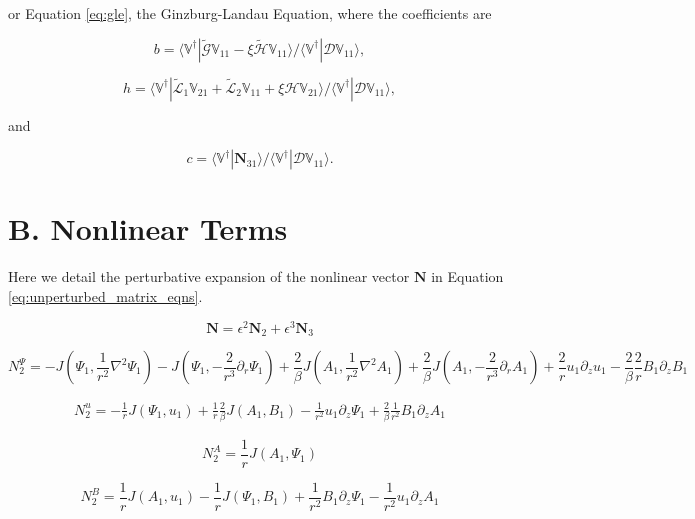 \documentclass{emulateapj}
\newcommand{\beq}{\begin{equation}}
\newcommand{\eeq}{\end{equation}}
\begin{document}
or Equation \ref{eq:gle}, the Ginzburg-Landau Equation, where the coefficients are 

\beq
b = \langle  \mathbb{V}^\dagger | \widetilde{\mathcal{G}} \mathbb{V}_{11} - \xi \widetilde{\mathcal{H}} \mathbb{V}_{11} \rangle / \langle \mathbb{V}^\dagger | \mathcal{D} \mathbb{V}_{11} \rangle,
\eeq

\beq
h = \langle \mathbb{V}^\dagger | \widetilde{\mathcal{L}}_1 \mathbb{V}_{21} + \widetilde{\mathcal{L}}_2 \mathbb{V}_{11} + \xi \mathcal{H} \mathbb{V}_{21} \rangle / \langle \mathbb{V}^\dagger | \mathcal{D} \mathbb{V}_{11} \rangle,
\eeq

and

\beq
c = \langle \mathbb{V}^\dagger | \mathbf{N}_{31} \rangle / \langle \mathbb{V}^\dagger | \mathcal{D} \mathbb{V}_{11} \rangle. 
\eeq

\section{B. Nonlinear Terms}\label{app:nonlinear_terms}

Here we detail the perturbative expansion of the nonlinear vector $\mathbf{N}$ in Equation \ref{eq:unperturbed_matrix_eqns}. 

\beq
\mathbf{N} = \epsilon^2 \mathbf{N}_2 + \epsilon^3 \mathbf{N}_3
\eeq

\beq
N_2^{\Psi}  = -J(\Psi_1, \frac{1}{r^2} \nabla^2 \Psi_1) - J(\Psi_1, -\frac{2}{r^3}\partial_r\Psi_1)
+ \frac{2}{\beta} J (A_1, \frac{1}{r^2} \nabla^2 A_1) + \frac{2}{\beta} J(A_1, -\frac{2}{r^3} \partial_r A_1) + \frac{2}{r} u_1 \partial_z u_1 - \frac{2}{\beta} \frac{2}{r} B_1 \partial_z B_1
\eeq

\beq
\begin{split}
N_2^{u} = -\frac{1}{r} J\left(\Psi_1, u_1\right) + \frac{1}{r} \frac{2}{\beta} J\left(A_1, B_1\right) - \frac{1}{r^2} u_1 \partial_z \Psi_1 + \frac{2}{\beta}\frac{1}{r^2} B_1 \partial_z A_1
\end{split}
\eeq

\beq
N_2^A = \frac{1}{r} J\left(A_1, \Psi_1\right)
\eeq

\beq
N_2^B = \frac{1}{r} J\left(A_1, u_1\right) - \frac{1}{r} J\left(\Psi_1, B_1\right) + \frac{1}{r^2} B_1 \partial_z \Psi_1 - \frac{1}{r^2} u_1 \partial_z A_1
\eeq
\end{document}
